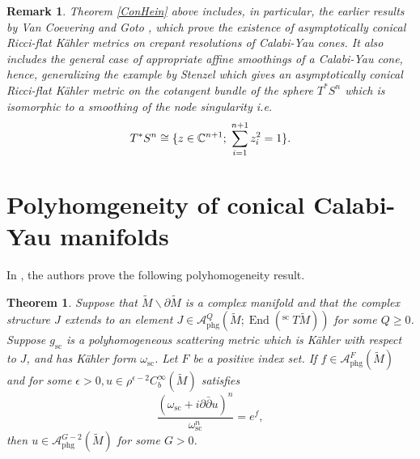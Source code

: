 \documentclass[a4paper,11pt]{article}
\newcounter{mythm}[section]
\newtheorem{tm}[mythm]{Theorem}
\newtheorem{rem}[mythm]{Remark}
\def\C{\mathbb{C}}
\begin{document}
\begin{rem} \label{remark AC CY}
Theorem \ref{ConHein} above includes, in particular, the earlier results by Van Coevering and Goto \cite{van_coevering_ricci-flat_2010, goto_calabi-yau_2012}, which prove the existence of asymptotically conical Ricci-flat Kähler metrics on crepant resolutions of Calabi-Yau cones. It also includes the general case of appropriate affine smoothings of a Calabi-Yau cone, hence, generalizing the example by Stenzel \cite{stenzel_ricci-flat_1993} which gives an asymptotically conical Ricci-flat Kähler metric on the cotangent bundle of the sphere $T^{*}S^n$ which is isomorphic to a smoothing of the node singularity i.e. 
$$
T^{*}S^n \cong \{ z \in \C^{n+1};  \hspace{0.1cm} \sum_{i=1}^{n+1} z_i^2 =1 \}.
$$ 
\end{rem}



\section{Polyhomgeneity of conical Calabi-Yau manifolds} \label{conphg}
In \cite[Theorem 6.3]{conlon_moduli_2015}, the authors prove the following polyhomogeneity result.
\begin{tm} \label{acphg}
Suppose that $\widetilde{M} \backslash \partial \widetilde{M}$ is a complex manifold and that the complex structure $J$ extends to an element $J \in \mathcal{A}_{\mathrm{phg}}^Q\left(\widetilde{M} ; \operatorname{End}\left({ }^{\text {sc }} T \widetilde{M}\right)\right)$ for some $Q \geq 0$. Suppose $g_{\mathrm{sc}}$ is a polyhomogeneous scattering metric which is Kähler with respect to $J$, and has Kähler form $\omega_{\mathrm{sc}}$. Let $F$ be a positive index set. If $f \in \mathcal{A}_{\mathrm{phg}}^F(\widetilde{M})$ and for some $\epsilon>0, u \in \rho^{\epsilon-2} C_b^{\infty}(\widetilde{M})$ satisfies
$$
\frac{\left(\omega_{\mathrm{sc}}+i \partial \bar{\partial} u\right)^n}{\omega_{\mathrm{sc}}^n}=e^f,
$$
then $u \in \mathcal{A}_{\mathrm{phg}}^{G-2}\left(\widetilde{M}\right)$ for some $G>0$.
\end{tm}
\end{document}

